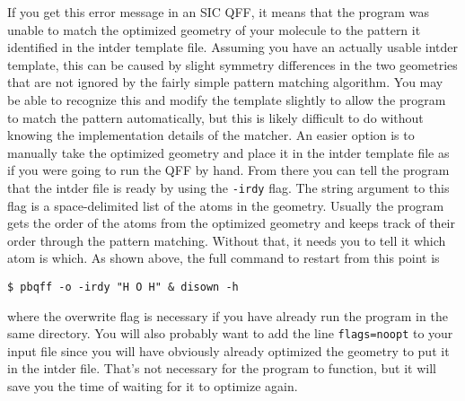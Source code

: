 \documentclass{article}
\begin{document}
If you get this error message in an SIC QFF, it means that the program
was unable to match the optimized geometry of your molecule to the
pattern it identified in the intder template file. Assuming you have
an actually usable intder template, this can be caused by slight
symmetry differences in the two geometries that are not ignored by the
fairly simple pattern matching algorithm. You may be able to recognize
this and modify the template slightly to allow the program to match
the pattern automatically, but this is likely difficult to do without
knowing the implementation details of the matcher. An easier option is
to manually take the optimized geometry and place it in the intder
template file as if you were going to run the QFF by hand. From there
you can tell the program that the intder file is ready by using the
\verb|-irdy| flag. The string argument to this flag is a
space-delimited list of the atoms in the geometry. Usually the program
gets the order of the atoms from the optimized geometry and keeps
track of their order through the pattern matching. Without that, it
needs you to tell it which atom is which. As shown above, the full
command to restart from this point is

\begin{verbatim}
$ pbqff -o -irdy "H O H" & disown -h
\end{verbatim}

\noindent
where the overwrite flag is necessary if you have already run the
program in the same directory. You will also probably want to add the
line \verb|flags=noopt| to your input file since you will have
obviously already optimized the geometry to put it in the intder file.
That's not necessary for the program to function, but it will save you
the time of waiting for it to optimize again.

\end{document}
